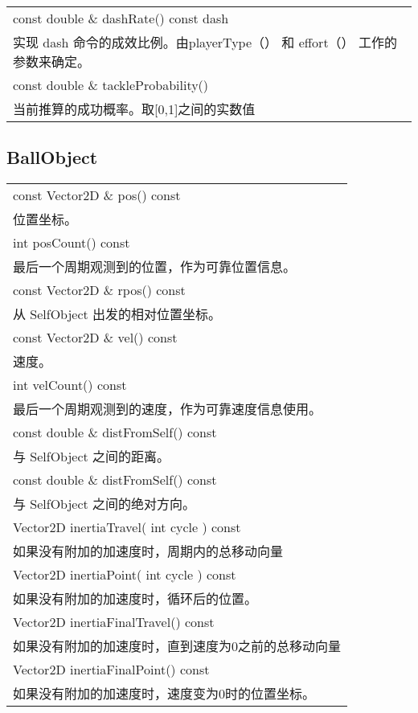 \begin{tabular}{p{}}
	\hline	
		const double \& dashRate() const dash \\
		实现 dash 命令的成效比例。由playerType（） 和 effort（） 工作的参数来确定。 \\
	\hline
		const double \& tackleProbability() \\
		当前推算的成功概率。取[0,1]之间的实数值\\
	\hline	
\end{tabular}

\subsection{BallObject}
\begin{tabular}{p{}}
	\hline
const Vector2D \& pos() const\\
位置坐标。 \\
\hline
int posCount() const\\
最后一个周期观测到的位置，作为可靠位置信息。 \\
\hline
const Vector2D \& rpos() const\\
从 SelfObject 出发的相对位置坐标。 \\
\hline
const Vector2D \& vel() const\\
速度。 \\
\hline
int velCount() const\\
最后一个周期观测到的速度，作为可靠速度信息使用。 \\
\hline
const double \& distFromSelf() const\\
与 SelfObject 之间的距离。 \\
\hline
const double \& distFromSelf() const\\
与 SelfObject 之间的绝对方向。 \\
\hline
Vector2D inertiaTravel( int cycle ) const\\
如果没有附加的加速度时，周期内的总移动向量\\
\hline
Vector2D inertiaPoint( int cycle ) const\\
如果没有附加的加速度时，循环后的位置。 \\
\hline
Vector2D inertiaFinalTravel() const\\
如果没有附加的加速度时，直到速度为0之前的总移动向量\\
\hline
Vector2D inertiaFinalPoint() const\\
如果没有附加的加速度时，速度变为0时的位置坐标。\\
\hline
\end{tabular}

